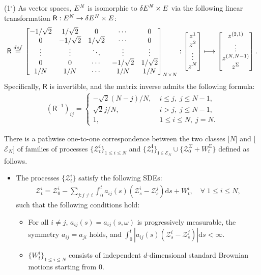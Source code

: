 \documentclass[12pt, twoside]{article}
\numberwithin{figure}{section}
\newcommand{\1}{\mathds 1}
\newcommand{\lmt}{\longmapsto}
\newcommand{\bs}{\boldsymbol}
\newcommand{\mc}{\mathcal}
\renewcommand{\d}{{\mathrm d}}
\newcommand{\2}{{\mathbf 1}}
\newcommand{\defeq}{{\stackrel{\rm def}{=}}}
\newcommand{\cc}{{^\circ}}
\newcommand{\bi}{\mathbf i}
\newcommand{\two}{{\sqrt{2}}}
\newcommand{\CN}{E^{\it N}}
\begin{document}
\begin{prop}\label{prop:RM}
{\rm (1$\cc$)} As vector spaces,
$\CN$ is isomorphic to  $\delta \CN\times E$ via the following
linear transformation $\mathsf R:\CN\to \delta \CN\times E$:
\begin{align}
\mathsf R\;\defeq\, \begin{bmatrix}
-1/\two & 1/\two & 0&\cdots &0\\
0 &-1/\two&1/\two& \cdots &0\\
\vdots &\vdots &\ddots &\vdots&\vdots\\
0 &0 &\cdots &-1/\two &1/\two\\
1/N&1/N &\cdots &1/N &1/N
\end{bmatrix}_{N\times N}:
\begin{bmatrix}
z^1\\
z^2\\
\vdots\\
z^N
\end{bmatrix}
\lmt \begin{bmatrix}
z^{(2,1)}\\
\vdots\\
z^{(N,N-1)}\\
z^\Sigma
\end{bmatrix}.\label{def:R}
\end{align}
Specifically, $\mathsf R$ is invertible, and the matrix inverse admits the following formula:
\begin{align}\label{def:Rinv}
(\mathsf R^{-1})_{ij}=
\begin{cases}
\displaystyle -\two (N-j)/N,&\; i\leq j,\; j\leq N-1,\\
\displaystyle \two j/N,&\;i>j,\;j\leq N-1,\\
\displaystyle 1, &\;1\leq i\leq N,\;j=N.
\end{cases}
\end{align} 

\noindent {\rm (2$\cc$)} There is a pathwise one-to-one correspondence between the two classes [$N$] and [$\mathcal E_N$] of families of processes $\{\mc Z^i_t \}_{1\leq i\leq N}$ and $\{\mathcal Z^\bi_t \}_{\bi\in\mc E_N}\cup \{\mc Z^\Sigma_0+W^\Sigma_t \}$ defined as follows.
\begin{itemize}[leftmargin=1.2cm]
\item [{\bf [$\bs N$]}] The processes $\{\mc Z^i_t \}$  satisfy the following SDEs:
\begin{align}\label{def:Zi}
\mc Z^i_t=\mc Z^i_0-\sum_{j:j\neq i}\int_0^t a_{i j}(s)(\mc Z^i_s-\mc Z^j_s)\d s+W^i_t,\quad \forall\;1\leq i\leq N,
\end{align}
such that the following conditions hold:
\begin{itemize}
\item [$\bullet$] For all $i\neq j$, $a_{ij}(s)=a_{ij}(s,\omega)$ is progressively measurable, the symmetry $a_{ij}=a_{ji}$ holds, and
$\int_0^t |a_{ij}(s)(\mc Z^i_s-\mc Z^j_s)|\d s<\infty$.
\item [$\bullet$]  $\{W^i_t \}_{1\leq i\leq N}$ consists of independent $d$-dimensional standard Brownian motions starting from $0$.
\end{itemize}


\end{itemize}
\end{prop}
\end{document}
